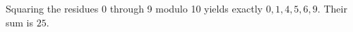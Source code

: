 Squaring the residues 0 through 9 modulo 10 yields exactly $ 0,1,4,5,6,9 $. Their sum is $\boxed{25}$.
